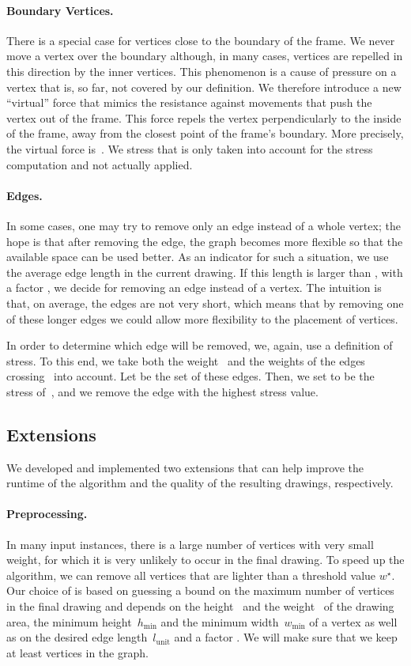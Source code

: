 \documentclass[]{llncs}
\newcommand{\lunit}{\ensuremath{l_\mathrm{unit}}\xspace}
\newcommand{\wmin}{\ensuremath{w^\star}\xspace}
\newcommand{\hmin}{\ensuremath{h_{\min}}\xspace}
\newcommand{\wimin}{\ensuremath{w_{\min}}\xspace}
\begin{document}
\paragraph{Boundary Vertices.} There is a special case for vertices
close to the boundary of the frame. We never move a vertex over
the boundary although, in many cases, vertices are repelled in this
direction by the inner vertices. This phenomenon is a cause of
pressure on a vertex that is, so far, not covered by our definition.
We therefore introduce a new ``virtual'' force that mimics the
resistance against movements that push the vertex out of the frame.
This force repels the vertex perpendicularly to the inside of the
frame, away from the closest point  of the frame's boundary. More
precisely, the virtual force is~.
We stress that  is only taken into account for the stress
computation and not actually applied.

\paragraph{Edges.}
In some cases, one may try to remove only an edge instead of a whole
vertex; the hope is that after removing the edge, the graph
becomes more flexible so that the available space can be used better.
As an indicator for such a situation, we use the average edge length
in the current drawing. If this length is larger than , with a factor , we decide for removing an edge
instead of a vertex. The intuition is that, on average, the edges are
not very short, which means that by removing one of these longer edges
we could allow more flexibility to the placement of vertices.

In order to determine which edge will be removed, we, again, use a
definition of stress. To this end, we take both the
weight~ and the weights of the edges crossing~ into account.
Let  be the set of these edges. Then, we set  to be the stress
of~, and we remove the edge with the highest stress value.


\subsection{Extensions}
\label{sec:gen-ext}
We developed and implemented two extensions that can help improve the
runtime of the algorithm and the quality of the resulting drawings,
respectively.

\paragraph{Preprocessing.}
In many input instances, there is a large number of vertices with
very small weight, for which it is very unlikely to occur in the final
drawing. To speed up the algorithm, we can remove all vertices that
are lighter than a threshold value \wmin. Our choice of  is
based on guessing a bound on the maximum number of vertices in the
final drawing and depends on the height~ and the weight~ of the
drawing area, the minimum height~\hmin and the minimum width~\wimin of
a vertex as well as on the desired edge length~\lunit
and a factor . We will make sure that we keep at least
 vertices in the graph.
\end{document}
